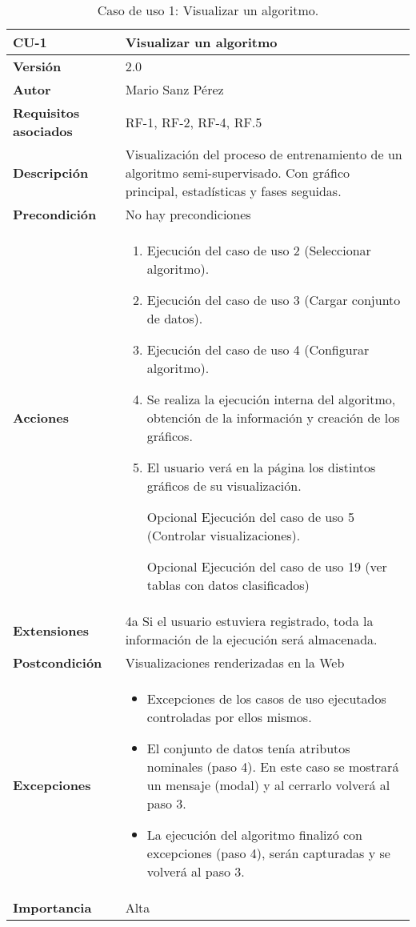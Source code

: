 \begin{table}[p]
	\centering
	\begin{tabularx}{\linewidth}{ p{} p{} }
		\toprule
		\textbf{CU-1}    & \textbf{Visualizar un algoritmo}\\
		\toprule
		\textbf{Versión}              & 2.0    \\
		\textbf{Autor}                & Mario Sanz Pérez \\
		\textbf{Requisitos asociados} & RF-1, RF-2, RF-4, RF.5 \\
		\textbf{Descripción}          & Visualización del proceso de entrenamiento de un algoritmo semi-supervisado. Con gráfico principal, estadísticas y fases seguidas. \\
		\textbf{Precondición}         & No hay precondiciones \\
		\textbf{Acciones}             &
		\begin{enumerate}
			\def\labelenumi{\arabic{enumi}.}
			\tightlist
			\item Ejecución del caso de uso 2 (Seleccionar algoritmo).
			\item Ejecución del caso de uso 3 (Cargar conjunto de datos).
			\item Ejecución del caso de uso 4 (Configurar algoritmo).
			\item Se realiza la ejecución interna del algoritmo, obtención de la información y creación de los gráficos.
			\item El usuario verá en la página los distintos gráficos de su visualización. 
			\item [Opcional] Ejecución del caso de uso 5 (Controlar visualizaciones).
			\item [Opcional] Ejecución del caso de uso 19 (ver tablas con datos clasificados)
 		\end{enumerate}\\
		\textbf{Extensiones}          & 4a Si el usuario estuviera registrado, toda la información de la ejecución será almacenada. \\
		\textbf{Postcondición}        & Visualizaciones renderizadas en la Web \\
		\textbf{Excepciones}          & \begin{itemize}
			\item Excepciones de los casos de uso ejecutados controladas por ellos mismos.
			\item El conjunto de datos tenía atributos nominales (paso 4). En este caso se mostrará un mensaje (modal) y al cerrarlo volverá al paso 3.
			\item La ejecución del algoritmo finalizó con excepciones (paso 4), serán capturadas y se volverá al paso 3.
		\end{itemize}	 \\
		\textbf{Importancia}          & Alta\\
		\bottomrule
	\end{tabularx}
	\caption[CU-01: Visualizar un algoritmo]{Caso de uso 1: Visualizar un algoritmo.}
\end{table}

